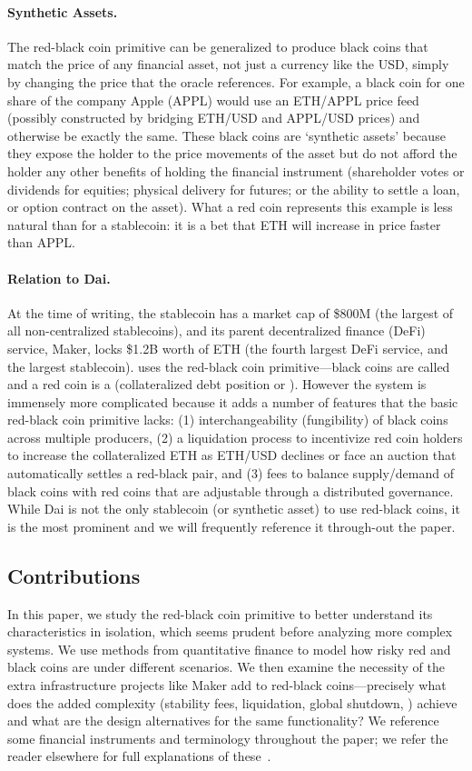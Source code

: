 \paragraph{Synthetic Assets.} The red-black coin primitive can be generalized to produce black coins that match the price of any financial asset, not just a currency like the USD, simply by changing the price that the oracle references. For example, a black coin for one share of the company Apple (APPL) would use an ETH/APPL price feed (possibly constructed by bridging ETH/USD and APPL/USD prices) and otherwise be exactly the same. These black coins are `synthetic assets' because they expose the holder to the price movements of the asset but do not afford the holder any other benefits of holding the financial instrument (\eg shareholder votes or dividends for equities; physical delivery for futures; or the ability to settle a loan, or option contract on the asset). What a red coin represents this example is less natural than for a stablecoin: it is a bet that ETH will increase in price faster than APPL.

\paragraph{Relation to Dai.} At the time of writing, the stablecoin \dai has a market cap of \$800M (the largest of all non-centralized stablecoins), and its parent decentralized finance (DeFi) service, Maker, locks \$1.2B worth of ETH (the fourth largest DeFi service, and the largest stablecoin). \dai uses the red-black coin primitive---black coins are called \dai and a red coin is a \vault (\nee collateralized debt position or \cdp). However the system is immensely more complicated because it adds a number of features that the basic red-black coin primitive lacks: (1) interchangeability (fungibility) of black coins across multiple producers, (2) a liquidation process to incentivize red coin holders to increase the collateralized ETH as ETH/USD declines or face an auction that automatically settles a red-black pair, and (3) fees to balance supply/demand of black coins with red coins that are adjustable through a distributed governance. While Dai is not the only stablecoin (or synthetic asset) to use red-black coins, it is the most prominent and we will frequently reference it through-out the paper.

\subsection{Contributions} In this paper, we study the red-black coin primitive to better understand its characteristics in isolation, which seems prudent before analyzing more complex systems. We use methods from quantitative finance to model how risky red and black coins are under different scenarios. We then examine the necessity of the extra infrastructure projects like Maker add to red-black coins---precisely what does the added complexity (\eg stability fees, liquidation, global shutdown, \etc) achieve and what are the design alternatives for the same functionality? We reference some financial instruments and terminology throughout the paper; we refer the reader elsewhere for full explanations of these~\cite{Har03}.

